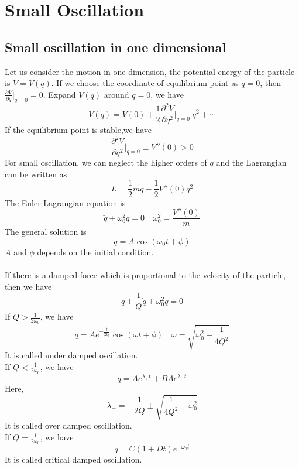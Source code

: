 \documentclass[cyan]{elegantnote}
\begin{document}
\chapter{Small Oscillation}
\section{Small oscillation in one dimensional}
Let us consider the motion in one dimension, the potential energy of the particle is $V = V(q)$. If we choose the coordinate of equilibrium point as $q=0$, then $ \frac{\partial V}{\partial q} |_{q=0} = 0$. Expand $V(q)$ around $q=0$, we have
\[V(q) = V(0) + \frac{1}{2}  \frac{\partial^2 V}{\partial q^2} |_{q=0} \; q^2 + \cdots  \]
If the equilibrium point is stable,we have
\[\frac{\partial^2 V}{\partial q^2} |_{q=0} \equiv V''(0) > 0\]
For small oscillation, we can neglect the higher orders of $q$ and the Lagrangian can be written as
\[L = \frac{1}{2}m\dot{q} - \frac{1}{2}V''(0)q^2\]
The Euler-Lagrangian equation is
\[\ddot{q} + \omega_0^2 q = 0 \quad \omega_0^2 = \frac{V''(0)}{m}\]
The general solution is
\[q = A\cos(\omega_0 t + \phi)\]
$A$ and $\phi$ depends on the initial condition. \\ \\
If there is a damped force which is proportional to the velocity of the particle, then we have
\[\ddot{q} + \frac{1}{Q}\dot{q} + \omega_0^2 q = 0\]
If $Q > \frac{1}{2\omega_0}$, we have
\[q = A e^{-\frac{t}{2Q}} \cos(\omega t + \phi) \quad \omega = \sqrt{\omega_0^2 - \frac{1}{4Q^2}}\]
It is called under damped oscillation.\\
If $Q < \frac{1}{2\omega_0}$, we have
\[q = Ae^{\lambda_+ t} + B Ae^{\lambda_- t}\]
Here,
\[\lambda_{\pm} = -\frac{1}{2Q} \pm \sqrt{\frac{1}{4Q^2} - \omega_0^2 }\]
It is called over damped oscillation.\\
If $Q = \frac{1}{2\omega_0}$, we have
\[q = C(1+Dt)e^{-\omega_0 t}\]
It is called critical damped oscillation.
\end{document}
